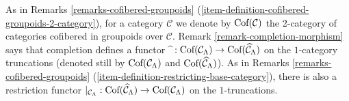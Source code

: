 \begin{remark}
\label{remark-completion-restriction-adjoint}
As in
Remarks \ref{remarks-cofibered-groupoids}
(\ref{item-definition-cofibered-groupoids-2-category}),
for a category $\mathcal C$ 
we denote by $\textnormal{Cof}(\mathcal C)$ the 2-category of categories 
cofibered in groupoids over $\mathcal C$. Remark 
\ref{remark-completion-morphism} says that completion defines a functor 
$\widehat{~}: \textnormal{Cof}(\mathcal C_{\Lambda}) \rightarrow 
\textnormal{Cof}(\widehat{\mathcal C}_{\Lambda})$ on the $1$-category 
truncations (denoted still by $\textnormal{Cof}(\mathcal C_{\Lambda})$ and 
$\textnormal{Cof}(\widehat{\mathcal C}_{\Lambda})$).  As in
Remarks \ref{remarks-cofibered-groupoids}
(\ref{item-definition-restricting-base-category}), 
there is also a restriction functor $|_{\mathcal C_{\Lambda}}: 
\textnormal{Cof}(\widehat{\mathcal C}_{\Lambda}) \rightarrow 
\textnormal{Cof}(\mathcal C_{\Lambda})$ on the $1$-truncations.  


\end{remark}
